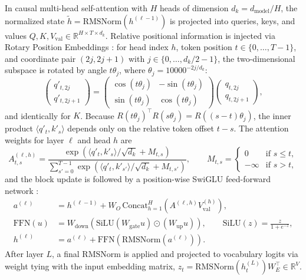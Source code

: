 \documentclass[11pt]{article}
\begin{document}
In causal multi-head self-attention \citep{vaswani2017} with $H$ heads of dimension $d_k = d_{\mathrm{model}}/H$, the normalized state $\tilde{h} = \mathrm{RMSNorm}(h^{(\ell-1)})$ is projected into queries, keys, and values $Q, K, V_{\mathrm{val}} \in \mathbb{R}^{H \times T \times d_k}$. Relative positional information is injected via Rotary Position Embeddings \citep[RoPE;][]{su2024rope}: for head index $h$, token position $t \in \{0, \dots, T-1\}$, and coordinate pair $(2j, 2j+1)$ with $j \in \{0, \dots, d_k/2 - 1\}$, the two-dimensional subspace is rotated by angle $t\theta_j$, where $\theta_j = 10000^{-2j/d_k}$:
\begin{equation}
\begin{pmatrix} q'_{t,2j} \\ q'_{t,2j+1} \end{pmatrix}
=
\begin{pmatrix} \cos(t\theta_j) & -\sin(t\theta_j) \\ \sin(t\theta_j) & \cos(t\theta_j) \end{pmatrix}
\begin{pmatrix} q_{t,2j} \\ q_{t,2j+1} \end{pmatrix},
\label{eq:rope}
\end{equation}
and identically for $K$. Because $R(t\theta_j)^\top R(s\theta_j) = R((s-t)\theta_j)$, the inner product $\langle q'_t, k'_s \rangle$ depends only on the relative token offset $t - s$. The attention weights for layer $\ell$ and head $h$ are
\begin{equation}
A^{(\ell, h)}_{t, s} = \frac{\exp\!\left(\langle q'_t, k'_s \rangle / \sqrt{d_k} + M_{t,s}\right)}{\sum_{s'=0}^{T-1} \exp\!\left(\langle q'_t, k'_{s'} \rangle / \sqrt{d_k} + M_{t,s'}\right)},
\qquad
M_{t,s} = \begin{cases} 0 & \text{if } s \le t, \\ -\infty & \text{if } s > t, \end{cases}
\label{eq:attn}
\end{equation}
and the block update is followed by a position-wise SwiGLU feed-forward network \citep{shazeer2020glu}:
\begin{align}
a^{(\ell)} &= h^{(\ell-1)} + W_O\,\mathrm{Concat}_{h=1}^H\!\left(A^{(\ell,h)} V_{\mathrm{val}}^{(h)}\right), \label{eq:res1} \\
\mathrm{FFN}(u) &= W_{\mathrm{down}}\!\left(\mathrm{SiLU}(W_{\mathrm{gate}} u) \odot (W_{\mathrm{up}} u)\right), \qquad \mathrm{SiLU}(z) = \frac{z}{1 + e^{-z}}, \label{eq:swiglu} \\
h^{(\ell)} &= a^{(\ell)} + \mathrm{FFN}\!\left(\mathrm{RMSNorm}(a^{(\ell)})\right). \label{eq:res2}
\end{align}
After layer $L$, a final $\mathrm{RMSNorm}$ is applied and projected to vocabulary logits via weight tying with the input embedding matrix, $z_t = \mathrm{RMSNorm}(h^{(L)}_t) W_E^\top \in \mathbb{R}^V$.
\end{document}
